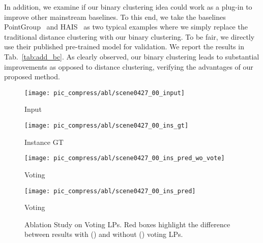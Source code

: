 \documentclass[10pt,twocolumn,letterpaper]{article}
\begin{document}
In addition, we examine if our binary clustering idea could work as a plug-in to improve other mainstream baselines. To this end, we take the baselines PointGroup~\cite{jiang2020pointgroup} and HAIS~\cite{chen2021hierarchical} as two typical examples where we  simply replace the traditional distance clustering with our binary clustering. To be fair, we directly use their published pre-trained model for validation. We report the results in  Tab.~\ref{tab:add_bc}. As clearly observed, our binary clustering leads to substantial improvements as opposed to distance clustering, verifying the advantages of our proposed method.
\begin{table}[ht]
\centering
\caption{Our binary clustering leads to consistent improvement  by simply replacing distance clustering on various baselines.}
\label{tab:add_bc}
\end{table}


\begin{figure}[t]
	\centering 
	\begin{minipage}{0.22\linewidth}
\centerline{\texttt{[image:  pic\_compress/abl/scene0427\_00\_input]}}
		\centerline{Input}
\end{minipage}
	\begin{minipage}{0.22\linewidth} 
\centerline{\texttt{[image:  pic\_compress/abl/scene0427\_00\_ins\_gt]}}
		\centerline{Instance GT}
\end{minipage}
	\begin{minipage}{0.22\linewidth}
\centerline{\texttt{[image:  pic\_compress/abl/scene0427\_00\_ins\_pred\_wo\_vote]}}
		\centerline{ Voting}


	\end{minipage}
	\begin{minipage}{0.22\linewidth}
\centerline{\texttt{[image:  pic\_compress/abl/scene0427\_00\_ins\_pred]}}
\centerline{ Voting}
	\end{minipage}
	\caption{Ablation Study on Voting LPs. Red boxes highlight the difference between results with () and without () voting LPs.}
	\label{fig:res_abl_vote}
\end{figure}
\end{document}
